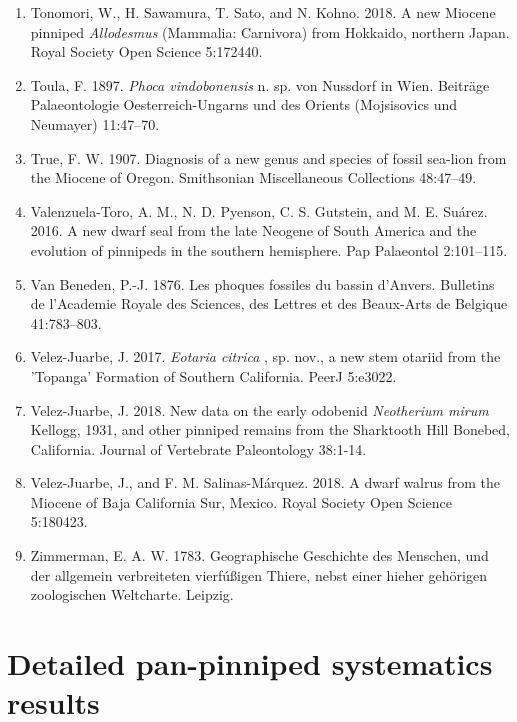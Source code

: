 \documentclass[a4paper, 12pt]{article}
\begin{document}
\begin{enumerate}
\item Tonomori, W., H. Sawamura, T. Sato, and N. Kohno. 2018. A new Miocene pinniped \textit{Allodesmus} (Mammalia: Carnivora) from Hokkaido, northern Japan. Royal Society Open Science 5:172440.
\item Toula, F. 1897. \textit{Phoca vindobonensis} n. sp. von Nussdorf in Wien. Beiträge Palaeontologie Oesterreich-Ungarns und des Orients (Mojsisovics und Neumayer) 11:47–70.
\item True, F. W. 1907. Diagnosis of a new genus and species of fossil sea-lion from the Miocene of Oregon. Smithsonian Miscellaneous Collections 48:47–49.
\item Valenzuela-Toro, A. M., N. D. Pyenson, C. S. Gutstein, and M. E. Suárez. 2016. A new dwarf seal from the late Neogene of South America and the evolution of pinnipeds in the southern hemisphere. Pap Palaeontol 2:101–115.
\item Van Beneden, P.-J. 1876. Les phoques fossiles du bassin d'Anvers. Bulletins de l'Academie Royale des Sciences, des Lettres et des Beaux-Arts de Belgique 41:783–803.
\item Velez-Juarbe, J. 2017. \textit{Eotaria citrica} , sp. nov., a new stem otariid from the 'Topanga' Formation of Southern California. PeerJ 5:e3022.
\item Velez-Juarbe, J. 2018. New data on the early odobenid \textit{Neotherium mirum} Kellogg, 1931, and other pinniped remains from the Sharktooth Hill Bonebed, California. Journal of Vertebrate Paleontology 38:1-14.
\item Velez-Juarbe, J., and F. M. Salinas-M\'{a}rquez. 2018. A dwarf walrus from the Miocene of Baja California Sur, Mexico. Royal Society Open Science 5:180423.
\item Zimmerman, E. A. W. 1783. Geographische Geschichte des Menschen, und der allgemein verbreiteten vierf\'{u}{\ss}igen Thiere, nebst einer hieher geh\"{o}rigen zoologischen Weltcharte. Leipzig.
\end{enumerate}


\newpage
\section{Detailed pan-pinniped systematics results}
\end{document}
